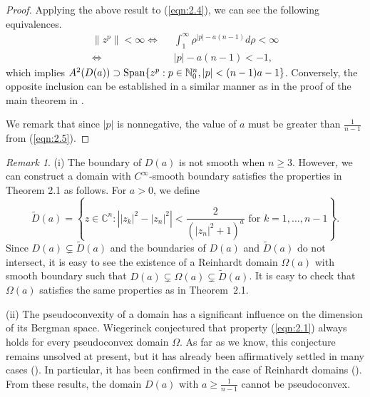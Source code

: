 \documentclass[12pt]{amsart}
\numberwithin{equation}{section}
\theoremstyle{definition}
\theoremstyle{remark}
\newtheorem{remark}[theorem]{Remark}
\newcommand{\C}{{\mathbb C}}
\newcommand{\N}{{\mathbb N}}
\newcommand{\1}{{\bf 1}}
\begin{document}
\begin{proof}
Applying the above result to (\ref{eqn:2.4}), 
we can see the following equivalences. 
%
\begin{equation}\label{eqn:2.5}
\begin{split}
\|z^{p}\|<\infty 
\Longleftrightarrow & \;\;
\int_1^{\infty} \rho^{|p|-a(n-1)}
d\rho<\infty  \\
\Longleftrightarrow & \;\;
|p|-a(n-1)<-1,  
\end{split}
\end{equation}
which implies 
$A^2(D(a))\supset 
{\rm Span}\{z^p:
p\in\N_0^n, 
|p|<(n-1)a-1\}$.
%
Conversely, the opposite inclusion can be 
established in a similar manner 
as in the proof of the main theorem in \cite{Wie84}.


We remark that 
since $|p|$ is nonnegative, 
the value of $a$ must be greater than 
$\frac{1}{n-1}$ from (\ref{eqn:2.5}). 



\end{proof}

\begin{remark}
(i) \;\;
The boundary of $D(a)$ is not smooth when $n\geq 3$. 
However,  we can construct a domain 
with $C^{\infty}$-smooth boundary satisfies 
the properties in Theorem 2.1 as follows. 
For $a>0$, we define
\begin{equation}
\tilde{D}(a)=
\left\{
z\in\C^n: 
\left||z_k|^2-|z_n|^2\right|<\frac{2}{(|z_n|^2+1)^{a}}
\mbox{ for $k=1,\ldots,n-1$}
\right\}.
\end{equation}
Since $D(a)\subsetneq \tilde{D}(a)$
and the boundaries of $D(a)$ and $\tilde{D}(a)$ 
do not intersect, 
it is easy to see the existence of 
a Reinhardt domain $\Omega(a)$
with smooth boundary such that 
$D(a)\subsetneq \Omega(a) \subsetneq \tilde{D}(a)$.
It is easy to check that $\Omega(a)$ satisfies 
the same properties as in Theorem~2.1.

(ii)\;\;
The pseudoconvexity of a domain 
has a significant influence on 
the dimension of its Bergman space. 
Wiegerinck \cite{Wie84} conjectured that 
property (\ref{eqn:2.1}) always holds 
for every pseudoconvex domain $\Omega$.
As far as we know, this conjecture remains 
unsolved at present, 
but it has already been affirmatively 
settled in many cases
(\cite{Zwo99, Zwo00, Eng07, Juc12, 
GHH17, PfZ17}).
In particular, 
it has been confirmed 
in the case of Reinhardt domains
(\cite{Zwo99, Zwo00, Eng07}). 
From these results,  the domain
$D(a)$ with $a\geq\frac{1}{n-1}$
cannot be pseudoconvex. 
\end{remark}
\end{document}
